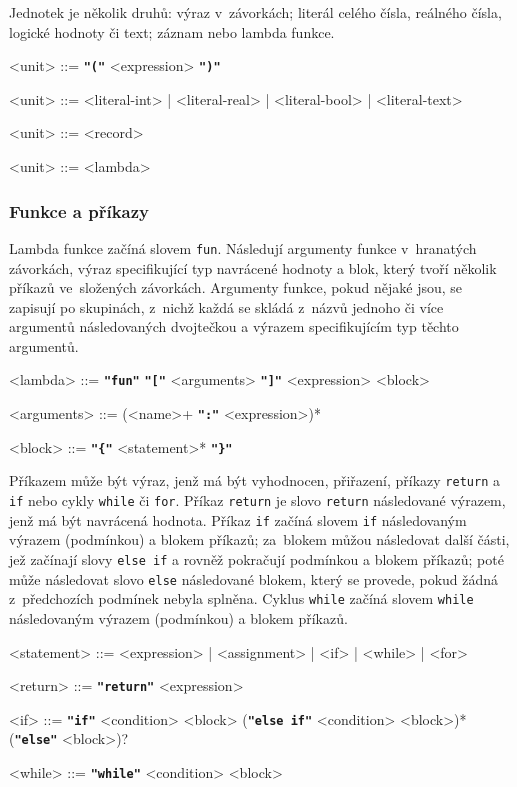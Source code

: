 \documentclass[a4paper,12pt]{article}
\def\quote #1{"#1"}
\def\emphasis #1{\textbf{\texttt{\quote{#1}}}}
\begin{document}
Jednotek je několik druhů: výraz v~závorkách; literál celého čísla, reálného čísla, logické hodnoty či text; záznam nebo lambda funkce.
\begin{grammar}
<unit> ::= \emphasis{(} <expression> \emphasis{)}

<unit> ::= <literal-int> | <literal-real> | <literal-bool> | <literal-text>

<unit> ::= <record>

<unit> ::= <lambda>
\end{grammar}

\subsubsection{Funkce a příkazy}
Lambda funkce začíná slovem \texttt{fun}. Následují argumenty funkce v~hranatých závorkách, výraz specifikující typ navrácené hodnoty a blok, který tvoří několik příkazů ve~složených závorkách. Argumenty funkce, pokud nějaké jsou, se zapisují po skupinách, z~nichž každá se skládá z~názvů jednoho či více argumentů následovaných dvojtečkou a výrazem specifikujícím typ těchto argumentů.
\begin{grammar}
<lambda> ::= \emphasis{fun} \emphasis{[} <arguments> \emphasis{]} <expression> <block>

<arguments> ::= (<name>+ \emphasis{:} <expression>)*

<block> ::= \emphasis{\{} <statement>* \emphasis{\}}
\end{grammar}

Příkazem může být výraz, jenž má být vyhodnocen, přiřazení, příkazy \texttt{return} a \texttt{if} nebo cykly \texttt{while} či \texttt{for}. Příkaz \texttt{return} je slovo \texttt{return} následované výrazem, jenž má být navrácená hodnota. Příkaz \texttt{if} začíná slovem \texttt{if} následovaným výrazem (podmínkou) a blokem příkazů; za~blokem můžou následovat další části, jež začínají slovy \texttt{else if} a rovněž pokračují podmínkou a blokem příkazů; poté může následovat slovo \texttt{else} následované blokem, který se provede, pokud žádná z~předchozích podmínek nebyla splněna. Cyklus \texttt{while} začíná slovem \texttt{while} následovaným výrazem (podmínkou) a blokem příkazů.
\begin{grammar}
<statement> ::= <expression> | <assignment> | <if> | <while> | <for>

<return> ::= \emphasis{return} <expression>

<if> ::= \emphasis{if} <condition> <block> (\emphasis{else if} <condition> <block>)* (\emphasis{else} <block>)?

<while> ::= \emphasis{while} <condition> <block>
\end{grammar}
\end{document}
